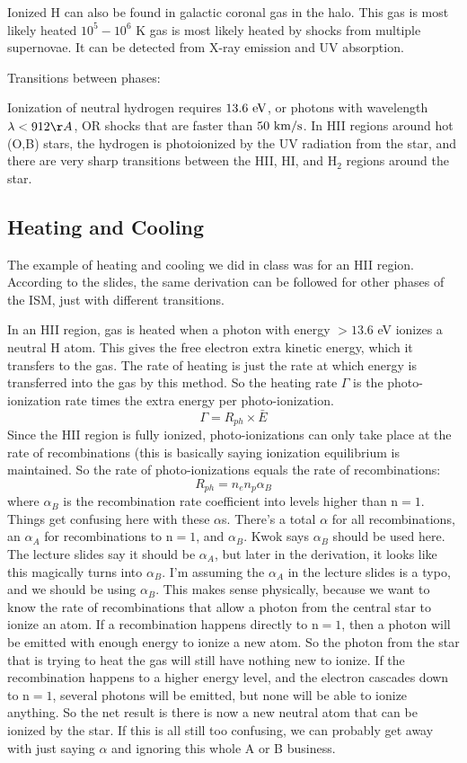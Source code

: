 Ionized H can also be found in galactic coronal gas in the halo.  This gas 
is most likely heated $10^5-10^6$ K gas is most likely heated by shocks from 
multiple supernovae.  It can be detected from X-ray emission and UV absorption.
 
 Transitions between phases:
 
 Ionization of neutral hydrogen requires $13.6~{\rm eV}$, or photons with wavelength $\lambda < 912 \AA$, OR shocks that are faster than $50~{\rm km/s}$. In HII regions around hot (O,B) stars, the hydrogen is photoionized by the UV radiation from the star, and there are very sharp transitions between the HII, HI, and H$_2$ regions around the star.

\subsection{Heating and Cooling}
The example of heating and cooling we did in class was for an HII region.  
According to the slides, the same derivation can be followed for other 
phases of the ISM, just with different transitions.  

In an HII region, gas is heated when a photon with energy $>13.6$ eV ionizes 
a neutral H atom.  This gives the free electron extra kinetic energy, which 
it transfers to the gas.  The rate of heating is just the rate at which 
energy is transferred into the gas by this method.  So the heating rate 
$\Gamma$ is the photo-ionization rate times the extra energy per 
photo-ionization.
\begin{equation}
\Gamma=R_{ph}\times\bar{E}
\end{equation}
Since the HII region is fully ionized, photo-ionizations can only take 
place at the rate of recombinations (this is basically saying ionization 
equilibrium is maintained.  So the rate of photo-ionizations equals the rate 
of recombinations:
\begin{equation}
R_{ph}=n_en_p\alpha_B
\end{equation}
where $\alpha_B$ is the recombination rate coefficient into levels higher than 
n$=1$.  Things get confusing here with these $\alpha$s.  There's a total $\alpha$ 
for all recombinations, an $\alpha_A$ for recombinations to n$=1$, and 
$\alpha_B$.  Kwok says $\alpha_B$ should be used here.  The lecture slides 
say it should be $\alpha_A$, but later in the derivation, it looks like this 
magically turns into $\alpha_B$.  I'm assuming the $\alpha_A$ in the lecture 
slides is a typo, and we should be using $\alpha_B$.  This makes sense 
physically, because we want to know the rate of recombinations that allow 
a photon from the central star to ionize an atom.  If a recombination happens 
directly to n$=1$, then a photon will be emitted with enough energy to 
ionize a new atom.  So the photon from the star that is trying to heat the gas 
will still have nothing new to ionize.  If the recombination happens to a 
higher energy level, and the electron cascades down to n$=1$, several photons 
will be emitted, but none will be able to ionize anything.  So the net result 
is there is now a new neutral atom that can be ionized by the star.  If this 
is all still too confusing, we can probably get away with just saying $\alpha$ 
and ignoring this whole A or B business. 


